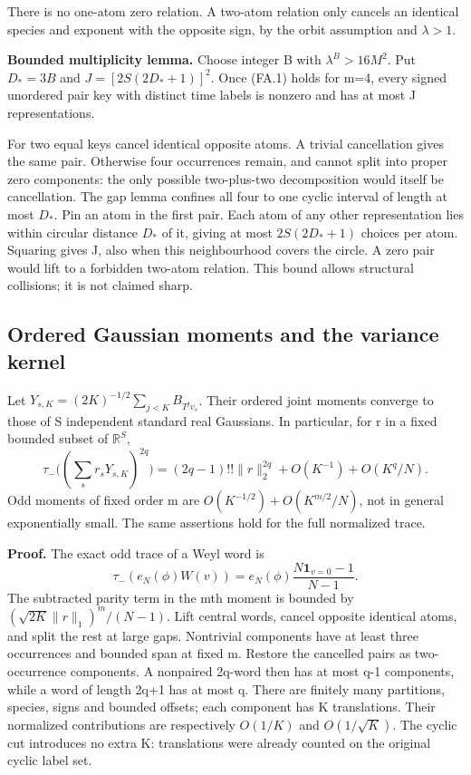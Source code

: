 There is no one-atom zero relation. A two-atom relation only cancels an identical species and exponent with the opposite sign, by the orbit assumption and \(\lambda>1\).

\textbf{Bounded multiplicity lemma.} Choose integer B with \(\lambda^B>16M^2\). Put \(D_*=3B\) and \(J=[2S(2D_*+1)]^2\). Once (FA.1) holds for m=4, every signed unordered pair key with distinct time labels is nonzero and has at most J representations.

For two equal keys cancel identical opposite atoms. A trivial cancellation gives the same pair. Otherwise four occurrences remain, and cannot split into proper zero components: the only possible two-plus-two decomposition would itself be cancellation. The gap lemma confines all four to one cyclic interval of length at most \(D_*\). Pin an atom in the first pair. Each atom of any other representation lies within circular distance \(D_*\) of it, giving at most \(2S(2D_*+1)\) choices per atom. Squaring gives J, also when this neighbourhood covers the circle. A zero pair would lift to a forbidden two-atom relation. This bound allows structural collisions; it is not claimed sharp.

\subsection{Ordered Gaussian moments and the variance kernel}\label{finite_fourier:ordered-gaussian-moments-and-the-variance-kernel}

Let \(Y_{s,K}=(2K)^{-1/2}\sum_{j<K} B_{T^jv_s}\). Their ordered joint moments converge to those of S independent standard real Gaussians. In particular, for r in a fixed bounded subset of \(\mathbb R^S\), \[
 \tau_-\bigl((\sum_s r_sY_{s,K})^{2q}\bigr)
 = (2q-1)!!\|r\|_2^{2q}+O(K^{-1})+O(K^q/N).                  \tag{FA.2}
\] Odd moments of fixed order m are \(O(K^{-1/2})+O(K^{m/2}/N)\), not in general exponentially small. The same assertions hold for the full normalized trace.

\textbf{Proof.} The exact odd trace of a Weyl word is \[
 \tau_-(e_N(\phi)W(v))=e_N(\phi)\frac{N\mathbf1_{v=0}-1}{N-1}. \tag{FA.3}
\] The subtracted parity term in the mth moment is bounded by \((\sqrt{2K}\|r\|_1)^m/(N-1)\). Lift central words, cancel opposite identical atoms, and split the rest at large gaps. Nontrivial components have at least three occurrences and bounded span at fixed m. Restore the cancelled pairs as two-occurrence components. A nonpaired 2q-word then has at most q-1 components, while a word of length 2q+1 has at most q. There are finitely many partitions, species, signs and bounded offsets; each component has K translations. Their normalized contributions are respectively \(O(1/K)\) and \(O(1/\sqrt K)\). The cyclic cut introduces no extra K: translations were already counted on the original cyclic label set.

